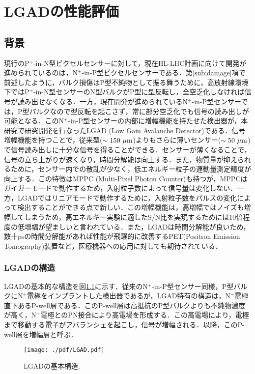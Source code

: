 \chapter{LGADの性能評価}
\label{chap:LGAD}
\section{背景}
現行のP$^{+}$-in-N型ピクセルセンサーに対して，現在HL-LHC計画に向けて開発が進められているのは，N$^{+}$-in-P型ピクセルセンサーである．第\ref{sub:damage}項で前述したように，バルク損傷はP型不純物として振る舞うために，高放射線環境下ではP$^{+}$-in-N型センサーのN型バルクがP型に型反転し，全空乏化しなければ信号が読み出せなくなる．一方，現在開発が進められているN$^{+}$-in-P型センサーでは，P型バルクなので型反転を起こさず，常に部分空乏化でも信号の読み出しが可能となる．このN$^{+}$-in-P型センサーの内部に増幅機能を持たせた検出器が，本研究で研究開発を行なったLGAD (Low Gain Avalanche Detector)である．信号増幅機能を持つことで，従来型($\sim150~\mu{\rm m}$)よりもさらに薄いセンサー($\sim50~\mu{\rm m}$)で信号読み出しに十分な信号を得ることができる．センサーが薄くなることで，信号の立ち上がりが速くなり，時間分解能は向上する．また，物質量が抑えられるために，センサー内での散乱が少なく，低エネルギー粒子の運動量測定精度が向上する．この特徴はMPPC (Multi-Pixel Photon Counter)も持つが，MPPCはガイガーモードで動作するため，入射粒子数によって信号量は変化しない．一方，LGADではリニアモードで動作するために，入射粒子数をパルスの変化によって検出することができる点で新しい．この増幅機能は，高増幅ではノイズも増幅してしまうため，高エネルギー実験に適したS/N比を実現するためには10倍程度の低増幅が望ましいと言われている．また，LGADは時間分解能が良いため，数十psの時間分解能があれば性能が飛躍的に改善するPET(Positron Emission Tomography)装置など，医療機器への応用に対しても期待されている．\par
\subsection{LGADの構造}
LGADの基本的な構造を図\ref{fig:LGADbase}に示す．従来のN$^{+}$-in-P型センサー同様，P型バルクにN$^{+}$電極をインプラントした検出器であるが，LGAD特有の構造は，N$^{+}$電極直下あるP-well層である．このP-well層は高抵抗のP型バルクよりも不純物濃度が高く，N$^{+}$電極とのPN接合により高電場を形成する．この高電場により，電極まで移動する電子がアバランシェを起こし，信号が増幅される．以降，このP-well層を増幅層と呼ぶ．\par
\begin{figure}[h]
	\centering
	\texttt{[image: ./pdf/LGAD.pdf]}
	\caption{LGADの基本構造.}
	\label{fig:LGADbase}
\end{figure}
